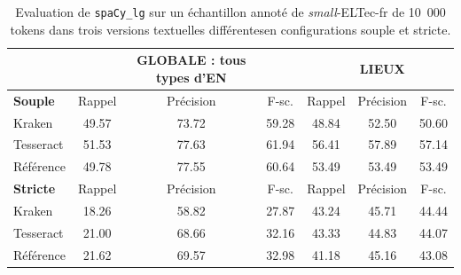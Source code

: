 \begin{table}[h!]
\centering
\scriptsize{\begin{tabular}{l|ccc|ccc}
 &		&	GLOBALE	: tous types d'EN &		&		&	LIEUX &		\\
\hline
 \hline
\textbf{Souple}	&	Rappel		&Précision	&	F-sc.	&	Rappel&		Précision		&F-sc.	\\
 \hline
Kraken	&	49.57	&	73.72 	&	59.28	&	48.84	&	52.50	&	50.60	\\
													
Tesseract	&	51.53	&	77.63	&	61.94	&	56.41	&	57.89	&	57.14	\\
													
Référence	&	49.78	&	77.55	&	60.64	&	53.49	&	53.49	&	53.49	\\
\hline
\hline
\textbf{Stricte}	&	Rappel		&Précision	&	F-sc.	&	Rappel&		Précision		&F-sc.	 \\
\hline
Kraken	&	18.26	&	58.82	&	27.87	&	43.24	&	45.71	&	44.44	\\
Tesseract	&	21.00	&	68.66	&	32.16	&	43.33	&	44.83	&	44.07	\\
Référence	&	21.62	&	69.57	&	32.98	&	41.18	&	45.16	&	43.08	\\
\hline
\hline
\end{tabular}}
\caption{Evaluation de \texttt{spaCy\_lg} sur un échantillon annoté de \textit{small}-ELTec-fr de 10~000 tokens dans trois versions textuelles différentes\label{tab:eval-supervise} en configurations souple et stricte. 
}
 \end{table}

